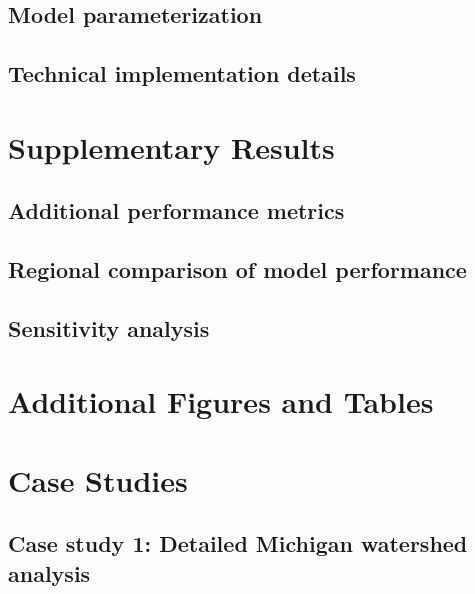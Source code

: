 \documentclass[preprint,12pt]{elsarticle}
\begin{document}
\subsection{Model parameterization}
\label{subsec:parameterization}

\subsection{Technical implementation details}
\label{subsec:tech_implementation}

\section{Supplementary Results}
\label{sec:suppl_results}

\subsection{Additional performance metrics}
\label{subsec:add_metrics}

\subsection{Regional comparison of model performance}
\label{subsec:regional_comparison}

\subsection{Sensitivity analysis}
\label{subsec:sensitivity}

\section{Additional Figures and Tables}
\label{sec:add_figures}

\section{Case Studies}
\label{sec:case_studies}

\subsection{Case study 1: Detailed Michigan watershed analysis}
\label{subsec:michigan_case}
\end{document}
